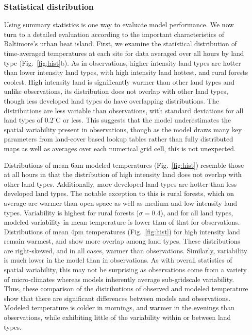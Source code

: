 \documentclass[draft,linenumbers]{agujournal}
\begin{document}
\subsubsection{Statistical distribution}
Using summary statistics is one way to evaluate model performance. %
We now turn to a detailed evaluation according to the important characteristics of Baltimore's urban heat island. 
First, we examine the statistical distribution of time-averaged temperatures at each site for data averaged over all hours by land type (Fig.~\ref{fig:hist}b). 
As in observations, higher intensity land types are hotter than lower intensity land types, with high intensity land hottest, and rural forests coolest. High intensity land is significantly warmer than other land types and unlike observations, its distribution does not overlap with other land types, though less developed land types do have overlapping distributions. 
The distributions are less variable than observations, with standard deviations for all land types of $0.2^\circ$C or less. This suggests that the model underestimates the spatial variability present in observations, though as the model draws many key parameters from land-cover based lookup tables rather than fully distributed maps as well as averages over each numerical grid cell, this is not unexpected. 

Distributions of mean 6am modeled temperatures (Fig.~\ref{fig:hist}) resemble those at all hours in that the distribution of high intensity land does not overlap with other land types. Additionally, more developed land types are hotter than less developed land types. The notable exception to this is rural forests, which on average are warmer than open space as well as medium and low intensity land types. Variability is highest for rural forests ($\sigma = 0.4$), and for all land types, modeled variability in mean temperature is lower than of that for observations. Distributions of mean 4pm temperatures (Fig.~\ref{fig:hist}) for high intensity land remain warmest, and show more overlap among land types. These distributions are right-skewed, and in all cases, warmer than observations. Similarly, variability is much lower in the model than in observations. As with overall statistics of spatial variability, this may not be surprising as observations come from a variety of micro-climates whereas models inherently average sub-gridscale variability. Thus, these comparison of the distributions of observed and modeled temperature show that there are significant differences between models and observations. Modeled temperature is colder in mornings, and warmer in the evenings than observations, while exhibiting little of the variability within or between land types. 
\end{document}
